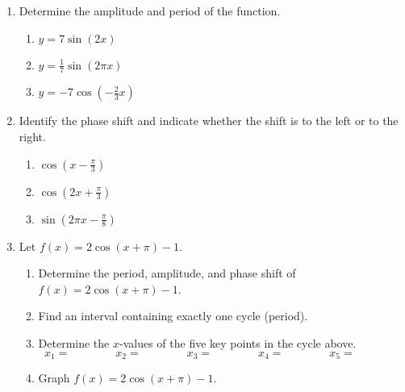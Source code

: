 \begin{enumerate}

\item Determine the amplitude and period of the function.
\begin{enumerate}
\item $y=7\sin(2x)$ \vfill
\item $\displaystyle y=\frac{1}{7}\sin(2\pi x)$ \vfill
\item $\displaystyle y=-7\cos\left(-\frac{2}{3}x\right)$ \vfill
\end{enumerate}

\item Identify the phase shift and indicate whether the shift is to the left or to the right.
\begin{enumerate}
\item $\displaystyle \cos\left(x-\frac{\pi}{3}\right)$\vfill
\item $\displaystyle \cos\left(2x+\frac{\pi}{3}\right)$\vfill
\item $\displaystyle \sin\left(2\pi x -\frac{\pi}{8}\right)$\vfill
\end{enumerate}


\clearpage

\item Let $f(x)=2\cos(x+\pi)-1$.

\begin{enumerate}

\item Determine the period, amplitude, and phase shift of $f(x)=2\cos(x+\pi)-1$.\vfill
\item Find an interval containing exactly one cycle (period).\vfill
\item Determine the $x$-values of the five key points in the cycle above.
$$x_1= \quad \quad \quad \quad x_2= \quad \quad \quad \quad x_3= \quad \quad \quad \quad x_4= \quad \quad \quad \quad x_5= \quad \quad \quad \quad$$
\vfill





\item Graph $f(x)=2\cos(x+\pi)-1$.

\end{enumerate}
\end{enumerate}
